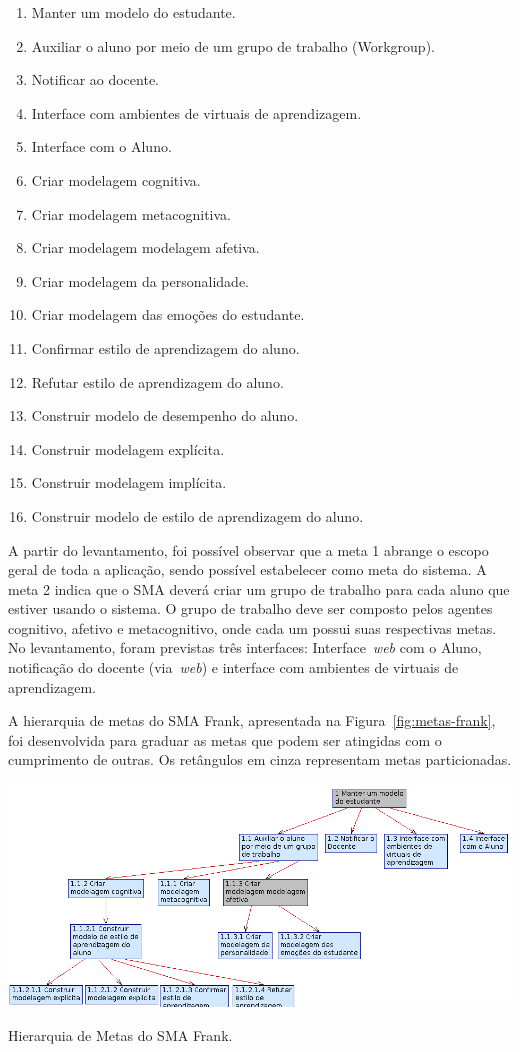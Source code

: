 \begin{enumerate}
	\item Manter um modelo do estudante.
	\item Auxiliar o aluno por meio de um grupo de trabalho (Workgroup).
	\item Notificar ao docente.
	\item Interface com ambientes de virtuais de aprendizagem.
	\item Interface com o Aluno.
	\item Criar modelagem cognitiva.
	\item Criar modelagem metacognitiva.
	\item Criar modelagem modelagem afetiva.
	\item Criar modelagem da personalidade.
	\item Criar modelagem das emoções do estudante.
	\item Confirmar estilo de aprendizagem do aluno.
	\item Refutar estilo de aprendizagem do aluno.
	\item Construir modelo de desempenho do aluno.
	\item Construir modelagem explícita.
	\item Construir modelagem implícita.
	\item Construir modelo de estilo de aprendizagem do aluno.
\end{enumerate}

A partir do levantamento, foi possível observar que a meta 1 abrange o escopo geral de toda a aplicação, sendo possível estabelecer como meta do sistema. A meta 2 indica que o SMA deverá criar um grupo de trabalho para cada aluno que estiver usando o sistema. O grupo de trabalho deve ser composto pelos agentes cognitivo, afetivo e metacognitivo, onde cada um possui suas respectivas metas. No levantamento, foram previstas três interfaces: Interface~\emph{web} com o Aluno, notificação do docente (via~\emph{web}) e interface com ambientes de virtuais de aprendizagem.

A hierarquia de metas do SMA Frank, apresentada na Figura~\ref{fig:metas-frank}, foi desenvolvida para graduar as metas que podem ser atingidas com o cumprimento de outras. Os retângulos em cinza representam metas particionadas.

\begin{table}
	\centering
	\includegraphics[scale=0.7]{images/metas-frank.png}
	\caption{Hierarquia de Metas do SMA Frank.}
	\label{fig:metas-frank}
\end{table}

